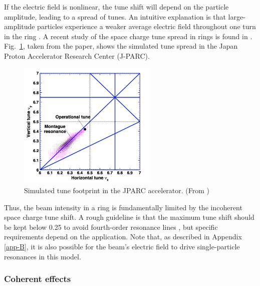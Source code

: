 If the electric field is nonlinear, the tune shift will depend on the particle amplitude, leading to a spread of tunes. An intuitive explanation is that large-amplitude particles experience a weaker average electric field throughout one turn in the ring \cite{Franchetti2017}. A recent study of the space charge tune spread in rings is found in \cite{Hotchi2020}. Fig.~\ref{fig:jparc_montague}, taken from the paper, shows the simulated tune spread in the Japan Proton Accelerator Research Center (J-PARC).
%
\begin{figure}[!p]
    \centering
    \includegraphics[width=0.6\textwidth]{Images/chapter1/montague.png}
    \caption{Simulated tune footprint in the JPARC accelerator. (From \cite{Hotchi2020})}
    \label{fig:jparc_montague}
\end{figure}
%

Thus, the beam intensity in a ring is fundamentally limited by the incoherent space charge tune shift. A rough guideline is that the maximum tune shift should be kept below 0.25 to avoid fourth-order resonance lines \cite{book:Reiser}, but specific requirements depend on the application. Note that, as described in Appendix \ref{app-B}, it is also possible for the beam's electric field to drive single-particle resonances in this model.



\subsubsection{Coherent effects}

